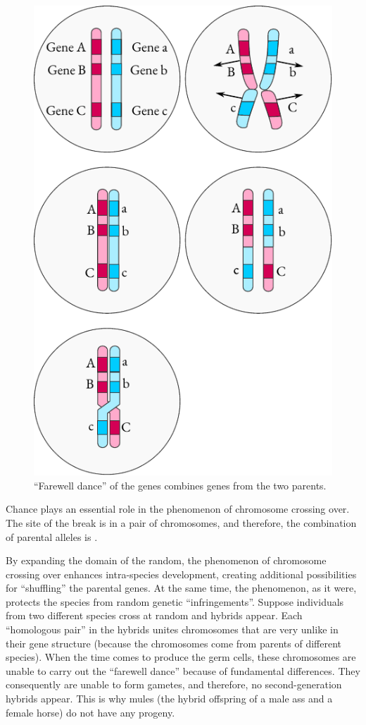 \begin{figure}[!ht]
\centering
\includegraphics[width=0.7\tfwidth]{figures/genes3.pdf}
\caption{``Farewell dance'' of the genes combines genes from the two parents.
\label{genes3}}
\end{figure}


Chance plays an essential role in the phenomenon of chromosome
crossing over. The site of the break is  in a pair of chromosomes, and therefore, the combination of parental alleles is  .

By expanding the domain of the random, the phenomenon of
chromosome crossing over enhances intra-species development, creating
additional possibilities for ``shuffling'' the parental genes. At the same
time, the phenomenon, as it were, protects the species from random
genetic ``infringements''. Suppose individuals from two different species
cross at random and hybrids appear. Each ``homologous pair'' in the
hybrids unites chromosomes that are very unlike in their gene structure
(because the chromosomes come from parents of different species). When
the time comes to produce the germ cells, these chromosomes are
unable to carry out the ``farewell dance'' because of fundamental
differences. They consequently are unable to form gametes, and therefore,
no second-generation hybrids appear. This is why mules (the
hybrid offspring of a male ass and a female horse) do not have any
progeny.

